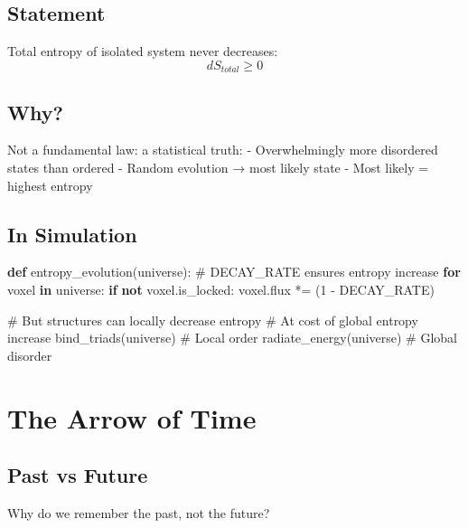 \documentclass[
  11pt,
  letterpaper,
  twoside,
  openright]{book}
\newenvironment{Shaded}{\begin{snugshade}}{\end{snugshade}}
\newcommand{\CommentTok}[1]{\textcolor[rgb]{0.37,0.37,0.37}{#1}}
\newcommand{\ControlFlowTok}[1]{\textcolor[rgb]{0.00,0.23,0.31}{\textbf{#1}}}
\newcommand{\DecValTok}[1]{\textcolor[rgb]{0.68,0.00,0.00}{#1}}
\newcommand{\KeywordTok}[1]{\textcolor[rgb]{0.00,0.23,0.31}{\textbf{#1}}}
\newcommand{\NormalTok}[1]{\textcolor[rgb]{0.00,0.23,0.31}{#1}}
\newcommand{\OperatorTok}[1]{\textcolor[rgb]{0.37,0.37,0.37}{#1}}
\begin{document}
\subsection{Statement}\label{statement}

Total entropy of isolated system never decreases: \[
dS_{total} \geq 0
\]

\subsection{Why?}\label{why-1}

Not a fundamental law: a statistical truth: - Overwhelmingly more
disordered states than ordered - Random evolution → most likely state -
Most likely = highest entropy

\subsection{In Simulation}\label{in-simulation-25}

\begin{Shaded}
\begin{Highlighting}[]
\KeywordTok{def}\NormalTok{ entropy\_evolution(universe):}
    \CommentTok{\# DECAY\_RATE ensures entropy increase}
    \ControlFlowTok{for}\NormalTok{ voxel }\KeywordTok{in}\NormalTok{ universe:}
        \ControlFlowTok{if} \KeywordTok{not}\NormalTok{ voxel.is\_locked:}
\NormalTok{            voxel.flux }\OperatorTok{*=}\NormalTok{ (}\DecValTok{1} \OperatorTok{{-}}\NormalTok{ DECAY\_RATE)}

    \CommentTok{\# But structures can locally decrease entropy}
    \CommentTok{\# At cost of global entropy increase}
\NormalTok{    bind\_triads(universe)  }\CommentTok{\# Local order}
\NormalTok{    radiate\_energy(universe)  }\CommentTok{\# Global disorder}
\end{Highlighting}
\end{Shaded}

\section{The Arrow of Time}\label{the-arrow-of-time}

\subsection{Past vs Future}\label{past-vs-future}

Why do we remember the past, not the future?
\end{document}
